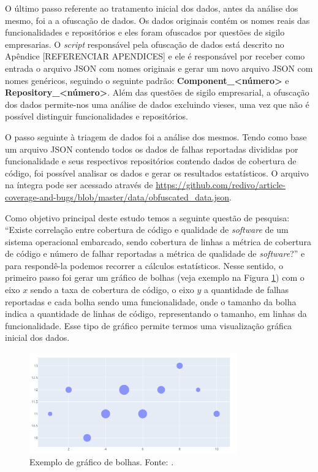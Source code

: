 \documentclass[11.5pt]{article}
\begin{document}
O último passo referente ao tratamento inicial dos dados, antes da análise dos mesmo, foi a
a ofuscação de dados.
Os dados originais contém os nomes reais das funcionalidades e repositórios e eles foram ofuscados
por questões de sigilo empresarias.
O \textit{script} responsável pela ofuscação de dados está descrito no Apêndice [REFERENCIAR APENDICES]
e ele é responsável por receber como entrada o arquivo JSON com nomes originais e gerar um novo
arquivo JSON com nomes genéricos, seguindo o seguinte padrão:
\textbf{Component\_\textless número\textgreater} e
\textbf{Repository\_\textless número\textgreater}.
Além das questões de sigilo empresarial, a ofuscação dos dados permite-nos uma análise de dados
excluindo vieses, uma vez que não é possível distinguir funcionalidades e repositórios.

O passo seguinte à triagem de dados foi a análise dos mesmos.
Tendo como base um arquivo JSON contendo todos os dados de falhas reportadas divididas por
funcionalidade e seus respectivos repositórios contendo dados de cobertura de código, foi possível
analisar os dados e gerar os resultados estatísticos.
O arquivo na íntegra pode ser acessado através de
\url{https://github.com/redivo/article-coverage-and-bugs/blob/master/data/obfuscated_data.json}.

Como objetivo principal deste estudo temos a seguinte questão de pesquisa:
``Existe correlação entre cobertura de código e qualidade de \textit{software} de um sistema
operacional embarcado, sendo cobertura de linhas a métrica de cobertura de código e número de falhar
reportadas a métrica de qualidade de \textit{software}?'' e para respondê-la podemos recorrer a
cálculos estatísticos.
Nesse sentido, o primeiro passo foi gerar um gráfico de bolhas (veja exemplo na
Figura \ref{fig:bubble_example}) com o eixo $x$ sendo a taxa de cobertura de código, o eixo $y$ a
quantidade de falhas reportadas e cada bolha sendo uma funcionalidade, onde o tamanho da bolha
indica a quantidade de linhas de código, representando o tamanho, em linhas da funcionalidade.
Esse tipo de gráfico permite termos uma visualização gráfica inicial dos dados.

\begin{figure}[ht]
    \centering
    \includegraphics[width=0.8\textwidth]{bubble_example.png}
    \caption{Exemplo de gráfico de bolhas. Fonte: \cite{plotly}.}
    \label{fig:bubble_example}
\end{figure}
\end{document}
